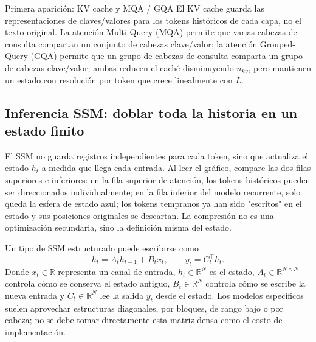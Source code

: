 \begin{knowledgebox}{Primera aparición: KV cache y MQA / GQA}
El KV cache guarda las representaciones de claves/valores para los tokens históricos de cada capa, no el texto original. La atención Multi-Query (MQA) permite que varias cabezas de consulta compartan un conjunto de cabezas clave/valor; la atención Grouped-Query (GQA) permite que un grupo de cabezas de consulta comparta un grupo de cabezas clave/valor; ambas reducen el caché disminuyendo $n_{kv}$, pero mantienen un estado con resolución por token que crece linealmente con $L$.
\end{knowledgebox}


\subsection{Inferencia SSM: doblar toda la historia en un estado finito}

El SSM no guarda registros independientes para cada token, sino que actualiza el estado $h_t$ a medida que llega cada entrada. Al leer el gráfico, compare las dos filas superiores e inferiores: en la fila superior de atención, los tokens históricos pueden ser direccionados individualmente; en la fila inferior del modelo recurrente, solo queda la esfera de estado azul; los tokens tempranos ya han sido "escritos" en el estado y sus posiciones originales se descartan. La compresión no es una optimización secundaria, sino la definición misma del estado.


Un tipo de SSM estructurado puede escribirse como
\[
h_t=A_t h_{t-1}+B_t x_t,
\qquad
y_t=C_t^{\top}h_t.
\]
Donde $x_t\in\mathbb{R}$ representa un canal de entrada, $h_t\in\mathbb{R}^{N}$ es el estado, $A_t\in\mathbb{R}^{N\times N}$ controla cómo se conserva el estado antiguo, $B_t\in\mathbb{R}^{N}$ controla cómo se escribe la nueva entrada y $C_t\in\mathbb{R}^{N}$ lee la salida $y_t$ desde el estado. Los modelos específicos suelen aprovechar estructuras diagonales, por bloques, de rango bajo o por cabeza; no se debe tomar directamente esta matriz densa como el costo de implementación.

